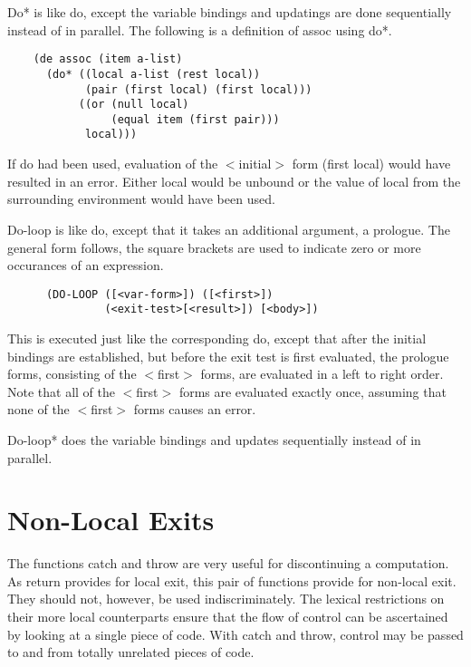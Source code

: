 {    Do* is like do, except the variable bindings  and  updatings
    are done sequentially instead of in parallel.  The following
    is a definition of assoc using do*.
}
\begin{verbatim}
    (de assoc (item a-list)
      (do* ((local a-list (rest local))
            (pair (first local) (first local)))
           ((or (null local)
                (equal item (first pair)))
            local)))
\end{verbatim}
    If do had been used, evaluation of the $<$initial$>$ form (first
    local)  would have resulted in an error.  Either local would
    be unbound or  the  value  of  local  from  the  surrounding
    environment would have been used.


{    Do-loop  is  like  do,  except  that  it takes an additional
    argument, a prologue.  The general form follows, the  square
    brackets  are used to indicate zero or more occurances of an
    expression.
}
\begin{verbatim}
      (DO-LOOP ([<var-form>]) ([<first>]) 
               (<exit-test>[<result>]) [<body>]) 
\end{verbatim}

    This is executed just like the corresponding do, except that
    after the initial bindings are established, but  before  the
    exit test is first evaluated, the prologue forms, consisting
    of  the  $<$first$>$  forms,  are  evaluated  in a left to right
    order.  Note that all of the  $<$first$>$  forms  are  evaluated
    exactly once, assuming that none of the $<$first$>$ forms causes
    an error.


{    Do-loop* does the variable bindings and updates sequentially
    instead of in parallel.
}
\section{Non-Local Exits}

   The   functions   catch   and   throw  are  very  useful  for
discontinuing a computation.  As return provides for local exit,
this pair of functions provide for non-local exit.  They  should
not,   however,   be   used   indiscriminately.     The  lexical
restrictions on their more local counterparts  ensure  that  the
flow  of control can be ascertained by looking at a single piece
of code.  With catch and throw, control may  be  passed  to  and
from totally unrelated pieces of code.


